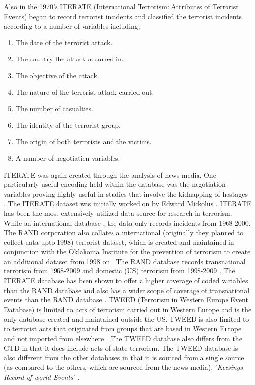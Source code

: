 Also in the 1970's ITERATE (International Terrorism: Attributes of Terrorist Events) began to record terrorist incidents and classified the terrorist incidents according to a number of variables including;  
\begin{enumerate}
\item The date of the terrorist attack.
\item The country the attack occurred in.
\item The objective of the attack.
\item The nature of the terrorist attack carried out.
\item The number of casualties.
\item The identity of the terrorist group.
\item The origin of both terrorists and the victims.
\item A number of negotiation variables.
\end{enumerate}
ITERATE was again created through the analysis of news media. One particularly useful encoding held within the database was the negotiation variables proving highly useful in studies that involve the kidnapping of hostages \citep{GPOL:GPOL142}. The ITERATE  dataset was initially worked on by Edward Mickolus \citep{mickolus2013iterate}. ITERATE has been the most extensively utilized data source for research in terrorism. While an international database , the data only records incidents from  1968-2000. The RAND corporation also collates a international (originally they planned to collect data upto 1998) terrorist dataset, which is created and maintained in conjunction with the Oklahoma Institute for the prevention of terrorism to create an additional dataset from 1998 on \citep{lafree2007introducing}.  The RAND database records transnational terrorism from 1968-2009 and domestic (US) terrorism from 1998-2009 \citep{sandler2013analytical}. The ITERATE database has been shown to offer a higher coverage of coded variables than the RAND database and also has a wider scope of coverage of transnational events than the RAND database \citep{enders2011political}. TWEED (Terrorism in Western Europe Event Database) is limited to acts of terrorism carried out in Western Europe and is the only database created and maintained outside the US. TWEED is also limited to to terrorist acts that originated from groups that are based in Western Europe and not imported from elsewhere \citep{engene2007five}. The TWEED database also differs from the GTD in that it does include acts of state terrorism. The TWEED database is also different from the other databases in that it is sourced from a single source (as compared to the others, which are sourced from the news media), '\textit{Keesings Record of world Events}' \citep{east2016keesing}.

